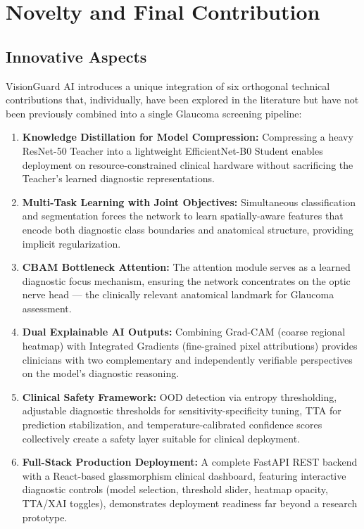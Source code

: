 \documentclass[conference]{IEEEtran}
\begin{document}
\section{Novelty and Final Contribution}

\subsection{Innovative Aspects}
VisionGuard AI introduces a unique integration of six orthogonal technical contributions that, individually, have been explored in the literature but have not been previously combined into a single Glaucoma screening pipeline:

\begin{enumerate}
    \item \textbf{Knowledge Distillation for Model Compression:} Compressing a heavy ResNet-50 Teacher into a lightweight EfficientNet-B0 Student enables deployment on resource-constrained clinical hardware without sacrificing the Teacher's learned diagnostic representations.
    \item \textbf{Multi-Task Learning with Joint Objectives:} Simultaneous classification and segmentation forces the network to learn spatially-aware features that encode both diagnostic class boundaries and anatomical structure, providing implicit regularization.
    \item \textbf{CBAM Bottleneck Attention:} The attention module serves as a learned diagnostic focus mechanism, ensuring the network concentrates on the optic nerve head --- the clinically relevant anatomical landmark for Glaucoma assessment.
    \item \textbf{Dual Explainable AI Outputs:} Combining Grad-CAM (coarse regional heatmap) with Integrated Gradients (fine-grained pixel attributions) provides clinicians with two complementary and independently verifiable perspectives on the model's diagnostic reasoning.
    \item \textbf{Clinical Safety Framework:} OOD detection via entropy thresholding, adjustable diagnostic thresholds for sensitivity-specificity tuning, TTA for prediction stabilization, and temperature-calibrated confidence scores collectively create a safety layer suitable for clinical deployment.
    \item \textbf{Full-Stack Production Deployment:} A complete FastAPI REST backend with a React-based glassmorphism clinical dashboard, featuring interactive diagnostic controls (model selection, threshold slider, heatmap opacity, TTA/XAI toggles), demonstrates deployment readiness far beyond a research prototype.
\end{enumerate}
\end{document}
